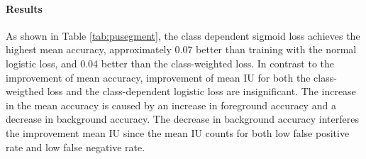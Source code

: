 \paragraph{Results}
As shown in Table \ref{tab:pusegment}, the class dependent sigmoid loss achieves the highest mean accuracy, approximately 0.07 better than training with the normal logistic loss, and 0.04 better than the class-weighted loss.
In contrast to the improvement of mean accuracy, improvement of mean IU for both the class-weigthed loss and the class-dependent logistic loss are insignificant.
The increase in the mean accuracy is caused by an increase in foreground accuracy and a decrease in background accuracy.
The decrease in background accuracy interferes the improvement mean IU since the mean IU counts for both low false positive rate and low false negative rate.


\begin{table}[t]
\caption{
Training foreground/background segmentation with different losses when 50\% of the objects are unsegmented.
The performances are achieved on the test set of PASCAL VOC2011 segmentation dataset.
Both the class-dependent sigmoid loss and the class-weighted logistic loss perform better than the normal logistic loss when 50\% objects unsegmented but not as good as the model trained with complete segmentations.
The class-dependent sigmoid loss has a better mean accuracy than the class-weighted logistic loss and a similar mean IU as the class-weighted logistic loss.
}
\label{tab:pusegment}
\end{table}


